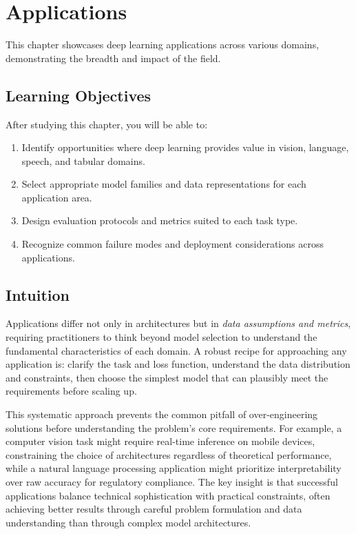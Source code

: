 
\chapter{Applications}
\label{chap:applications}

This chapter showcases deep learning applications across various domains, demonstrating the breadth and impact of the field.


\section*{Learning Objectives}

After studying this chapter, you will be able to:

\begin{enumerate}
    \item Identify opportunities where deep learning provides value in vision, language, speech, and tabular domains.
    \item Select appropriate model families and data representations for each application area.
    \item Design evaluation protocols and metrics suited to each task type.
    \item Recognize common failure modes and deployment considerations across applications.
\end{enumerate}



\section*{Intuition}

Applications differ not only in architectures but in \emph{data assumptions and metrics}, requiring practitioners to think beyond model selection to understand the fundamental characteristics of each domain. A robust recipe for approaching any application is: clarify the task and loss function, understand the data distribution and constraints, then choose the simplest model that can plausibly meet the requirements before scaling up.

This systematic approach prevents the common pitfall of over-engineering solutions before understanding the problem's core requirements. For example, a computer vision task might require real-time inference on mobile devices, constraining the choice of architectures regardless of theoretical performance, while a natural language processing application might prioritize interpretability over raw accuracy for regulatory compliance. The key insight is that successful applications balance technical sophistication with practical constraints, often achieving better results through careful problem formulation and data understanding than through complex model architectures.

